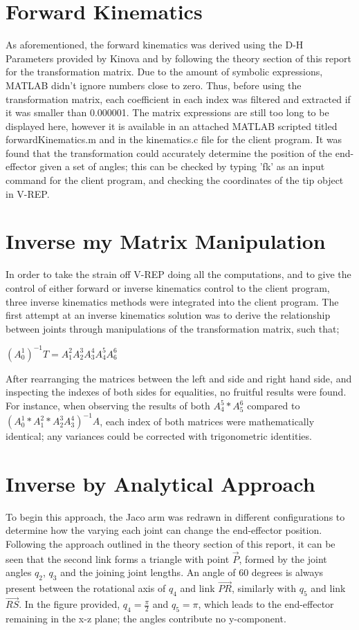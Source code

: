 \documentclass[12pt,openany,a4paper]{book}
\begin{document}
\section{Forward Kinematics}
As aforementioned, the forward kinematics was derived using the D-H Parameters provided by Kinova and by following the theory section of this report for the transformation matrix. Due to the amount of symbolic expressions, MATLAB didn't ignore numbers close to zero. Thus, before using the transformation matrix, each coefficient in each index was filtered and extracted if it was smaller than 0.000001. The matrix expressions are still too long to be displayed here, however it is available in an attached MATLAB scripted titled forwardKinematics.m and in the kinematics.c file for the client program. It was found that the transformation could accurately determine the position of the end-effector given a set of angles; this can be checked by typing 'fk' as an input command for the client program, and checking the coordinates of the tip object in V-REP.

\section{Inverse my Matrix Manipulation}
In order to take the strain off V-REP doing all the computations, and to give the control of either forward or inverse kinematics control to the client program, three inverse kinematics methods were integrated into the client program. The first attempt at an inverse kinematics solution was to derive the relationship between joints through manipulations of the transformation matrix, such that;

$(A_{0}^{1})^{-1} T = A_{1}^{2} A_{2}^{3} A_{3}^{4} A_{4}^{5} A_{6}^{6}$

After rearranging the matrices between the left and side and right hand side, and inspecting the indexes of both sides for equalities, no fruitful results were found. For instance, when observing the results of both $A_4^5 * A_5^6$ compared to $(A_0^1 * A_1^2 * A_2^3 A_3^4)^{-1} A$, each index of both matrices were mathematically identical; any variances could be corrected with trigonometric identities. 

\section{Inverse by Analytical Approach}

To begin this approach, the Jaco arm was redrawn in different configurations to determine how the varying each joint can change the end-effector position. Following the approach outlined in the theory section of this report, it can be seen that the second link forms a triangle with point $\vec{P}$, formed by the joint angles $q_2$, $q_3$ and the joining joint lengths. An angle of 60 degrees is always present between the rotational axis of $q_4$ and link $\vec{PR}$, similarly with $q_5$ and link $\vec{RS}$. In the figure provided, $q_4 = \frac{\pi}{2}$ and $q_5 = \pi$, which leads to the end-effector remaining in the x-z plane; the angles contribute no y-component. 
\end{document}
